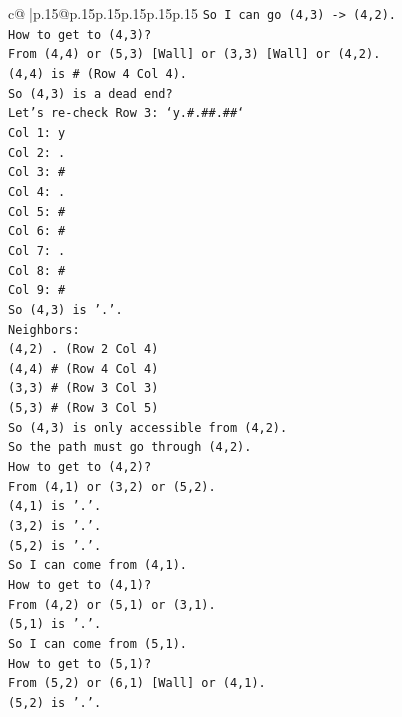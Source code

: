 \documentclass{article}
\begin{document}
{\begin{supertabular}{c@{$\;$}|p{.15\linewidth}@{}p{.15\linewidth}p{.15\linewidth}p{.15\linewidth}p{.15\linewidth}p{.15\linewidth}}
{{{\texttt{So I can go (4,3) {-}> (4,2).} \\
\texttt{How to get to (4,3)?} \\
\texttt{From (4,4) or (5,3) {[}Wall{]} or (3,3) {[}Wall{]} or (4,2).} \\
\texttt{(4,4) is \# (Row 4 Col 4).} \\
\texttt{So (4,3) is a dead end?} \\
\texttt{Let's re{-}check Row 3: `y.\#.\#\#.\#\#`} \\
\texttt{Col 1: y} \\
\texttt{Col 2: .} \\
\texttt{Col 3: \#} \\
\texttt{Col 4: .} \\
\texttt{Col 5: \#} \\
\texttt{Col 6: \#} \\
\texttt{Col 7: .} \\
\texttt{Col 8: \#} \\
\texttt{Col 9: \#} \\
\texttt{So (4,3) is '.'.} \\
\texttt{Neighbors:} \\
\texttt{(4,2) . (Row 2 Col 4)} \\
\texttt{(4,4) \# (Row 4 Col 4)} \\
\texttt{(3,3) \# (Row 3 Col 3)} \\
\texttt{(5,3) \# (Row 3 Col 5)} \\
\texttt{So (4,3) is only accessible from (4,2).} \\
\texttt{So the path must go through (4,2).} \\
\texttt{How to get to (4,2)?} \\
\texttt{From (4,1) or (3,2) or (5,2).} \\
\texttt{(4,1) is '.'.} \\
\texttt{(3,2) is '.'.} \\
\texttt{(5,2) is '.'.} \\
\texttt{So I can come from (4,1).} \\
\texttt{How to get to (4,1)?} \\
\texttt{From (4,2) or (5,1) or (3,1).} \\
\texttt{(5,1) is '.'.} \\
\texttt{So I can come from (5,1).} \\
\texttt{How to get to (5,1)?} \\
\texttt{From (5,2) or (6,1) {[}Wall{]} or (4,1).} \\
\texttt{(5,2) is '.'.} \\
}}}
\end{supertabular}}
\end{document}
